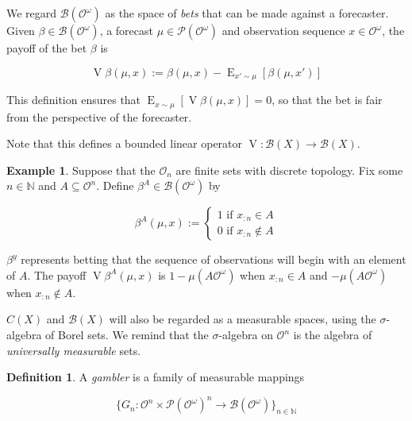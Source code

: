 \documentclass[11pt]{article}
\theoremstyle{definition}
\newtheorem{definition}{Definition}%
\newtheorem{example}{Example}%
\theoremstyle{plain}
\newcommand{\Nats}{\mathbb{N}}
\newcommand{\Sq}[2]{\{#1\}_{#2 \in \Nats}}
\newcommand{\Sqn}[1]{\Sq{#1}{n}}
\DeclareMathOperator{\E}{E}
\newcommand{\PM}{\mathcal{P}}
\newcommand{\Ob}{\mathcal{O}}
\newcommand{\OO}{\Ob^\omega}
\newcommand{\PMO}{\PM(\OO)}
\newcommand{\Gm}{\mathcal{B}}
\newcommand{\GMO}{\Gm(\OO)}
\DeclareMathOperator{\V}{V}
\begin{document}
We regard $\GMO$ as the space of \emph{bets} that can be made against a forecaster. Given $\beta \in \GMO$, a forecast $\mu \in \PMO$ and observation sequence $x \in \OO$, the payoff of the bet $\beta$ is

\begin{equation}
\V{\beta}\left(\mu,x\right):=\beta\left(\mu,x\right) - \E_{x' \sim \mu}\left[\beta\left(\mu,x'\right)\right]
\end{equation}

This definition ensures that $\E_{x\sim\mu}\left[\V{\beta}(\mu,x)\right] = 0$, so that the bet is fair from the perspective of the forecaster.

Note that this defines a bounded linear operator $\V: \Gm\left(X\right) \rightarrow \Gm\left(X\right)$.

\begin{samepage}
\begin{example}

Suppose that the $\Ob_n$ are finite sets with discrete topology. Fix some $n\in\Nats$ and $A \subseteq \Ob^n$. Define $\beta^A \in \GMO$ by

\begin{equation}
\beta^{A}(\mu,x):=\begin{cases} 1 \text{ if } x_{:n} \in A \\ 0 \text{ if } x_{:n} \not\in A \end{cases}
\end{equation}


$\beta^y$ represents betting that the sequence of observations will begin with an element of $A$. The payoff $\V{\beta^A}(\mu,x)$ is $1 - \mu\left(A\Ob^\omega\right)$ when $x_{:n} \in A$ and $-\mu\left(A\Ob^\omega\right)$ when $x_{:n} \not\in A$.

\end{example}
\end{samepage}

$C\left(X\right)$ and $\Gm\left(X\right)$ will also be regarded as a measurable spaces, using the $\sigma$-algebra of Borel sets. We remind that the $\sigma$-algebra on $\Ob^n$ is the algebra of \emph{universally measurable} sets.

\begin{definition}

A \emph{gambler} is a family of measurable mappings

\[\Sqn{G_n : \Ob^n \times \PMO^n \rightarrow \Gm\left(\OO\right)}\]

\end{definition}
\end{document}

